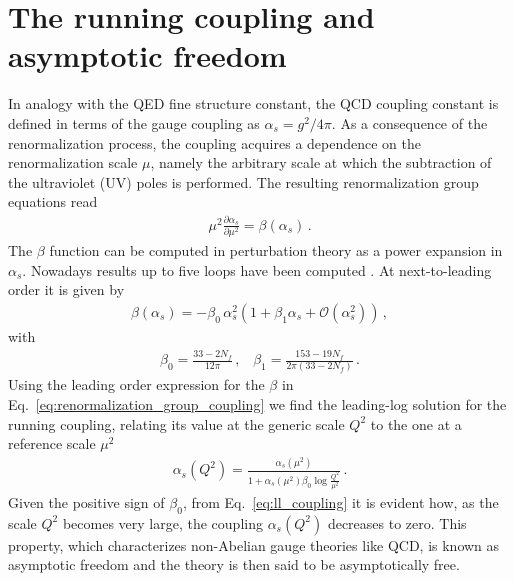

\section{The running coupling and asymptotic freedom}
%
In analogy with the QED fine structure constant,
the QCD coupling constant is defined in terms of the gauge coupling as $\alpha_s = g^2/4\pi$.
As a consequence of the renormalization process, the coupling acquires a dependence on the renormalization scale $\mu$,
namely the arbitrary scale at which the subtraction of the ultraviolet (UV) poles is performed. 
The resulting renormalization group equations read
\begin{align}
    \label{eq:renormalization_group_coupling}
    \mu^2\frac{\partial\alpha_s}{\partial \mu^2} = \beta\left(\alpha_s\right)\,.
\end{align}
The $\beta$ function can be computed in perturbation theory as a power expansion in $\alpha_s$. 
Nowadays results up to five loops have been computed \cite{Herzog:2017ohr}.
At next-to-leading order it is given by
\begin{align}
    \label{eq:beta_function_expansion}
    \beta\left(\alpha_s\right) = -\beta_0\,\alpha_s^2\left(1+ \beta_1 \alpha_s + \mathcal{O}\left(\alpha_s^2\right)\right)\,,
\end{align}
with
\begin{align}
    \label{eq:beta_function_coefficients}
    \beta_0 = \frac{33 - 2 N_f}{12\pi}\,,\,\,\,\,\,
    \beta_1 = \frac{153 -19 N_f}{2\pi\left(33-2 N_f\right)}\,.
\end{align}
Using the leading order expression for the $\beta$ in Eq.~\eqref{eq:renormalization_group_coupling} we find the leading-log
solution for the running coupling, relating its value at the generic scale $Q^2$ to the one at a reference scale
$\mu^2$ 
\begin{align}
    \label{eq:ll_coupling}
    \alpha_s\left(Q^2\right) = \frac{\alpha_s\left(\mu^2\right)}{1+\alpha_s\left(\mu^2\right)\beta_0\log\frac{Q^2}{\mu^2}}\,.
\end{align}
Given the positive sign of $\beta_0$, from Eq.~\eqref{eq:ll_coupling} it is evident how, as the scale $Q^2$ becomes very large, 
the coupling $\alpha_s\left(Q^2\right)$ decreases to zero. This property, which characterizes non-Abelian gauge theories 
like QCD, is known as asymptotic freedom and the theory is then said to be asymptotically free.
